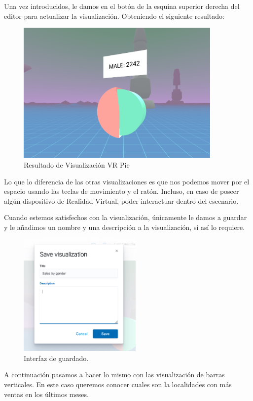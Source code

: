 \documentclass[a4paper, 12pt]{book}
\begin{document}
Una vez introducidos, le damos en el botón de la esquina superior derecha del editor para actualizar la visualización. Obteniendo el siguiente resultado:

\begin{figure}[H]
  \centering
  \includegraphics[width=10cm, keepaspectratio]{img/development/visualizacion-pie-use.png}
  \caption{Resultado de Visualización VR Pie}
  \label{fig:}
\end{figure}

Lo que lo diferencia de las otras visualizaciones es que nos podemos mover por el espacio usando las teclas de movimiento y el ratón. Incluso, en caso de poseer algún dispositivo de Realidad Virtual, poder interactuar dentro del escenario.

Cuando estemos satisfechos con la visualización, únicamente le damos a guardar y le añadimos un nombre y una descripción a la visualización, si así lo requiere.

\begin{figure}[H]
  \centering
  \includegraphics[width=6cm, keepaspectratio]{img/development/save.png}
  \caption{Interfaz de guardado.}
  \label{fig:guardado}
\end{figure}

A continuación pasamos a hacer lo mismo con las visualización de barras verticales. En este caso queremos conocer cuales son la localidades con más ventas en los últimos meses.
\end{document}
